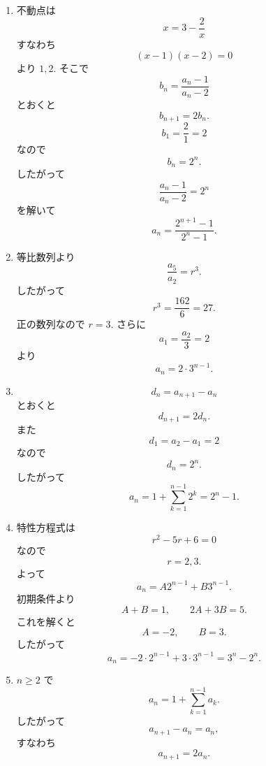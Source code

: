 \begin{enumerate}[label=\textbf{問\arabic*.},leftmargin=3.8em,format=\bookitemlink{practice-basic}{solution}{problem}]
\[            =
            \frac{a_{n+1}}{a_n}.
          \]
              したがって隣接項の比は一定である.
              初めの比は
          \[
            \frac{a_2}{a_1}=3
          \]
              なので
          \[
            a_n=2\cdot3^{n-1}.
          \]
        \item 不動点は
          \[
            x=3-\frac2x
          \]
              すなわち
          \[
            (x-1)(x-2)=0
          \]
              より \(1,2\).
              そこで
          \[
            b_n=\frac{a_n-1}{a_n-2}
          \]
              とおくと
          \[
            b_{n+1}=2b_n.
          \]
          \[
            b_1=\frac{2}{1}=2
          \]
              なので
          \[
            b_n=2^n.
          \]
              したがって
          \[
            \frac{a_n-1}{a_n-2}=2^n
          \]
              を解いて
          \[
            a_n=\frac{2^{n+1}-1}{2^n-1}.
          \]
        \item 等比数列より
          \[
            \frac{a_5}{a_2}=r^3.
          \]
              したがって
          \[
            r^3=\frac{162}{6}=27.
          \]
              正の数列なので \(r=3\).
              さらに
          \[
            a_1=\frac{a_2}{3}=2
          \]
              より
          \[
            a_n=2\cdot3^{n-1}.
          \]
        \item \[
            d_n=a_{n+1}-a_n
          \]
              とおくと
          \[
            d_{n+1}=2d_n.
          \]
              また
          \[
            d_1=a_2-a_1=2
          \]
              なので
          \[
            d_n=2^n.
          \]
              したがって
          \[
            a_n
            =1+\sum_{k=1}^{n-1}2^k
            =2^n-1.
          \]
        \item 特性方程式は
          \[
            r^2-5r+6=0
          \]
              なので
          \[
            r=2,3.
          \]
              よって
          \[
            a_n=A2^{n-1}+B3^{n-1}.
          \]
              初期条件より
          \[
            A+B=1,\qquad 2A+3B=5.
          \]
              これを解くと
          \[
            A=-2,\qquad B=3.
          \]
              したがって
          \[
            a_n=-2\cdot2^{n-1}+3\cdot3^{n-1}
            =3^n-2^n.
          \]
        \item \(n\ge2\) で
          \[
            a_n=1+\sum_{k=1}^{n-1}a_k.
          \]
              したがって
          \[
            a_{n+1}-a_n=a_n,
          \]
              すなわち
          \[
            a_{n+1}=2a_n.
\]
\end{enumerate}
